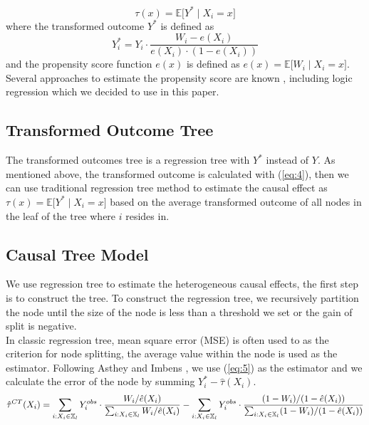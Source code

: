 \begin{equation}\label{eq:3.5}
\tau(x) = \mathbb{E} \big[   Y^{*} \mid X_{i} =  x\big] 
\end{equation}
where the transformed outcome $Y^{*}$  is defined as
\begin{equation} \label{eq:4}
Y_{i}^{*} =  Y_{i} \cdot \frac{W_{i} - e(X_{i})}{e(X_{i}) \cdot (1 - e(X_{i}))} 
\end{equation}
%
and the propensity score function $e(x)$ is defined as $e(x)= \mathbb{E} \big[  W_{i} \mid X_{i} =  x \big]$.
%
Several approaches to estimate the propensity score are known \cite{rose:rubi:cent:1983}, \cite{HoImaKin07} including logic regression which we decided to use in this paper.
%

\subsection{Transformed Outcome Tree}
The transformed outcomes tree is a regression tree with $Y^{*}$ instead of $Y$. As mentioned above, the transformed outcome is calculated with  (\ref{eq:4}), then we can use traditional regression tree method to estimate the causal effect as 
$\tau(x) = \mathbb{E} \big[   Y^{*} \mid X_{i} =  x\big] $ based on the average transformed outcome of all nodes in the leaf of the tree where $i$ resides in.

\subsection{Causal Tree Model}
We use regression tree to estimate the heterogeneous causal effects, the first step is to construct the tree. To construct the regression tree, we recursively partition the node until the size of the node is less than a threshold we set or the gain of split is negative.\\
In classic regression tree, mean square error (MSE) is often used to as the criterion for node splitting, the average value within the node is used as the estimator. Following Asthey and Imbens \cite{1504.01132}, we use (\ref{eq:5}) as the estimator and we calculate the error of the node by summing $Y_{i}^ {*}- \hat{\tau}(X_{i})$.
\begin{equation} \label{eq:5}
\hat{\tau}^{CT}(X_{i}) = \sum_{i:X_{i} \in \mathbb{X}_{l}}  Y_{i}^{obs} \cdot \frac{ W_{i} / \hat{e}(X_{i})  }{\sum_{i:X_{i} \in \mathbb{X}_{l}}  W_{i} / \hat{e}(X_{i})}  \\
 - \sum_{i:X_{i} \in \mathbb{X}_{l}}  Y_{i}^{obs} \cdot\frac{ (1 - W_{i}) / (1 - \hat{e}(X_{i}))  }{\sum_{i:X_{i} \in \mathbb{X}_{l}}  (1 - W_{i}) / (1 - \hat{e}(X_{i}))}
\end{equation}


